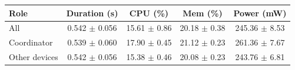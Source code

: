 \begin{tabular}{lcccc}
\hline
\textbf{Role} & \textbf{Duration (s)} & \textbf{CPU (\%)} & \textbf{Mem (\%)} & \textbf{Power (mW)} \\
\hline
All & 0.542 $\pm$ 0.056 & 15.61 $\pm$ 0.86 & 20.18 $\pm$ 0.38 & 245.36 $\pm$ 8.53 \\
Coordinator & 0.539 $\pm$ 0.060 & 17.90 $\pm$ 0.45 & 21.12 $\pm$ 0.23 & 261.36 $\pm$ 7.67 \\
Other devices & 0.542 $\pm$ 0.056 & 15.38 $\pm$ 0.46 & 20.08 $\pm$ 0.23 & 243.76 $\pm$ 6.81 \\
\hline
\end{tabular}
